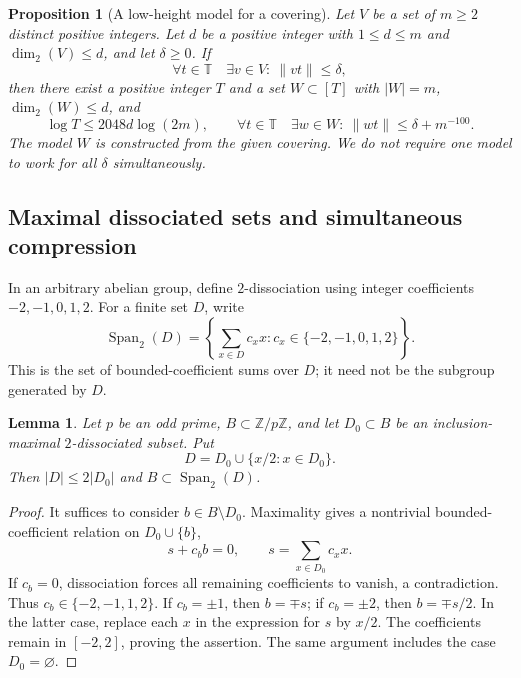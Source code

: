 \documentclass[12pt,leqno]{article}
\numberwithin{equation}{section}
\newtheorem{proposition}[theorem]{Proposition}
\newtheorem{lemma}[theorem]{Lemma}
\theoremstyle{remark}
\newcommand{\LRtorus}{\mathbb T}
\newcommand{\LRdimension}{\operatorname{dim}_2}
\begin{document}
\begin{proposition}[A low-height model for a covering]\label{prop:model}
Let $V$ be a set of $m\ge2$ distinct positive integers. Let $d$ be a positive integer with $1\le d\le m$ and $\LRdimension(V)\le d$, and let $\delta\ge0$. If
\[
\forall t\in\LRtorus\quad\exists v\in V:\ \|vt\|\le\delta,
\]
then there exist a positive integer $T$ and a set $W\subset[T]$ with $|W|=m$, $\LRdimension(W)\le d$, and
\begin{equation}\label{eq:model}
\log T\le2048d\log(2m),\qquad
\forall t\in\LRtorus\quad\exists w\in W:\ \|wt\|\le\delta+m^{-100}.
\end{equation}
The model $W$ is constructed from the given covering. We do not require one model to work for all $\delta$ simultaneously.
\end{proposition}

\subsection{Maximal dissociated sets and simultaneous compression}
In an arbitrary abelian group, define $2$-dissociation using integer coefficients $-2,-1,0,1,2$. For a finite set $D$, write
\[
\operatorname{Span}_2(D)=\left\{\sum_{x\in D}c_xx:c_x\in\{-2,-1,0,1,2\}\right\}.
\]
This is the set of bounded-coefficient sums over $D$; it need not be the subgroup generated by $D$.

\begin{lemma}\label{lem:spanhalf}
Let $p$ be an odd prime, $B\subset\mathbb Z/p\mathbb Z$, and let $D_0\subset B$ be an inclusion-maximal $2$-dissociated subset. Put
\[
D=D_0\cup\{x/2:x\in D_0\}.
\]
Then $|D|\le2|D_0|$ and $B\subset\operatorname{Span}_2(D)$.
\end{lemma}
\begin{proof}
It suffices to consider $b\in B\setminus D_0$. Maximality gives a nontrivial bounded-coefficient relation on $D_0\cup\{b\}$,
\[
s+c_bb=0,\qquad s=\sum_{x\in D_0}c_xx.
\]
If $c_b=0$, dissociation forces all remaining coefficients to vanish, a contradiction. Thus $c_b\in\{-2,-1,1,2\}$. If $c_b=\pm1$, then $b=\mp s$; if $c_b=\pm2$, then $b=\mp s/2$. In the latter case, replace each $x$ in the expression for $s$ by $x/2$. The coefficients remain in $[-2,2]$, proving the assertion. The same argument includes the case $D_0=\varnothing$.
\end{proof}
\end{document}
